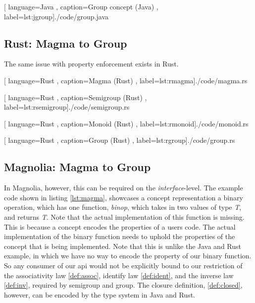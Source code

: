 \begin{center}
  
    [ language=Java
    , caption={Group concept (Java)}
    , label=lst:jgroup]{./code/group.java}
\end{center}

\subsection{Rust: Magma to Group}

The same issue with property enforcement exists in Rust.

\begin{center}
  
    [ language=Rust
    , caption={Magma (Rust)}
    , label=lst:rmagma]{./code/magma.rs}
\end{center}

\begin{center}
  
    [ language=Rust
    , caption={Semigroup (Rust)}
    , label=lst:rsemigroup]{./code/semigroup.rs}
\end{center}

\begin{center}
  
    [ language=Rust
    , caption={Monoid (Rust)}
    , label=lst:rmonoid]{./code/monoid.rs}
\end{center}

\begin{center}
  
    [ language=Rust
    , caption={Group (Rust)}
    , label=lst:rgroup]{./code/group.rs}
\end{center}

\subsection{Magnolia: Magma to Group}

In Magnolia, however, this can be required on the \textit{interface}-level. The
example code shown in listing \ref{lst:magma}, showcases a concept
representation a binary operation, which has one function, \textit{binop}, which
takes in two values of type \textit{T}, and returns \textit{T}. Note that the
actual implementation of this function is missing. This is because a concept
encodes the properties of a users code. The actual implementation of the
binary function needs to uphold the properties of the concept that is
being implemented. Note that this is unlike the Java and Rust example, in
which we have no way to encode the property of our binary function. So any
consumer of our \gls{api} would not be explicitly bound to our restriction of
the associativity law \ref{def:assoc}, identify law \ref{def:ident}, and the
inverse law \ref{def:inv}, required by semigroup and group. The closure
definition, \ref{def:closed}, however, can be encoded by the type system in Java
and Rust.

